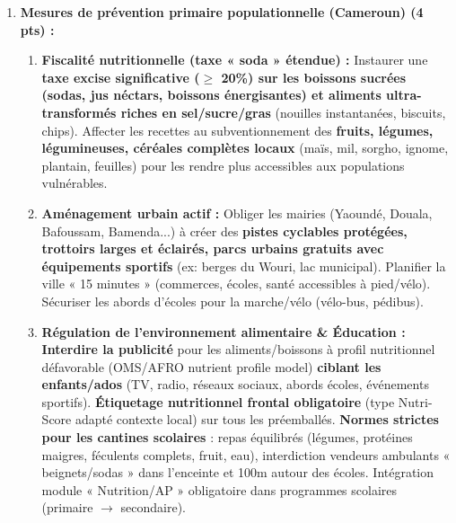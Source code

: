 \documentclass[11pt]{article}
\begin{document}
\begin{corrige}
\begin{enumerate}
\item \textbf{Mesures de prévention primaire populationnelle (Cameroun) (4 pts) :}
\begin{enumerate}
\item \textbf{Fiscalité nutritionnelle (taxe « soda » étendue) :} Instaurer une \textbf{taxe excise significative ($\ge$ 20\%) sur les boissons sucrées (sodas, jus néctars, boissons énergisantes) et aliments ultra-transformés riches en sel/sucre/gras} (nouilles instantanées, biscuits, chips). Affecter les recettes au subventionnement des \textbf{fruits, légumes, légumineuses, céréales complètes locaux} (maïs, mil, sorgho, ignome, plantain, feuilles) pour les rendre plus accessibles aux populations vulnérables.
\item \textbf{Aménagement urbain actif :} Obliger les mairies (Yaoundé, Douala, Bafoussam, Bamenda...) à créer des \textbf{pistes cyclables protégées, trottoirs larges et éclairés, parcs urbains gratuits avec équipements sportifs} (ex: berges du Wouri, lac municipal). Planifier la ville « 15 minutes » (commerces, écoles, santé accessibles à pied/vélo). Sécuriser les abords d'écoles pour la marche/vélo (vélo-bus, pédibus).
\item \textbf{Régulation de l'environnement alimentaire \& Éducation :} \textbf{Interdire la publicité} pour les aliments/boissons à profil nutritionnel défavorable (OMS/AFRO nutrient profile model) \textbf{ciblant les enfants/ados} (TV, radio, réseaux sociaux, abords écoles, événements sportifs). \textbf{Étiquetage nutritionnel frontal obligatoire} (type Nutri-Score adapté contexte local) sur tous les préemballés. \textbf{Normes strictes pour les cantines scolaires} : repas équilibrés (légumes, protéines maigres, féculents complets, fruit, eau), interdiction vendeurs ambulants « beignets/sodas » dans l'enceinte et 100m autour des écoles. Intégration module « Nutrition/AP » obligatoire dans programmes scolaires (primaire $\rightarrow$ secondaire).
\end{enumerate}
\end{enumerate}
\end{corrige}
\end{document}
